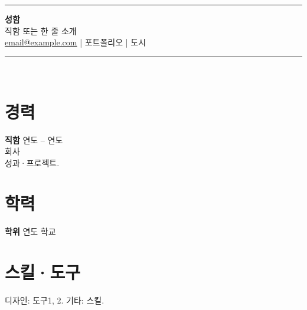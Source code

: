 \documentclass[11pt,a4paper]{article}
\begin{document}
\begin{center}\rule{2.2cm}{2.8cm}\end{center}
\begin{center}
{\LARGE \textbf{성함}}\\[0.15em]
{\color{gray} 직함 또는 한 줄 소개}\\[0.4em]
\href{mailto:email@example.com}{email@example.com} \quad | \quad 포트폴리오 \quad | \quad 도시
\end{center}
\vspace{0.5em}
\noindent\rule{\textwidth}{1pt}\\[0.3em]
\section*{경력}
\textbf{직함} \hfill 연도 -- 연도 \\
회사 \\
성과·프로젝트.
\section*{학력}
\textbf{학위} \hfill 연도 \quad 학교
\section*{스킬·도구}
디자인: 도구1, 2. \quad 기타: 스킬.
\end{document}
